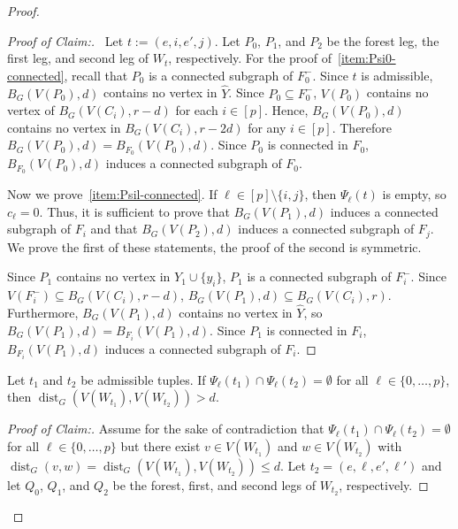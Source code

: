 \documentclass{patmorin}
\newcommand{\pat}[1]{\textcolor{Blue}{[Pat: #1]}}
\newenvironment{clmproof}{\begin{proof}[Proof of Claim:]\renewcommand{\qedsymbol}{\rule{1ex}{1ex}}}{\end{proof}}
\DeclareMathOperator{\dist}{dist}
\begin{document}
\begin{proof}
\begin{clmproof}\
    Let $t:=(e,i,e',j)$. 
    Let $P_0$, $P_1$, and $P_2$ be the forest leg, the first leg, and second leg of $W_t$, respectively.   For the proof of~\cref{item:Psi0-connected}, recall that $P_0$ is a connected subgraph of $F_0^-$. Since $t$ is admissible, $B_G(V(P_0),d)$ contains no vertex in $\widehat{Y}$. Since $P_0\subseteq F_0^-$, $V(P_0)$ contains no vertex of $B_G(V(C_i),r-d)$ for each $i\in[p]$. Hence, $B_G(V(P_0),d)$ contains no vertex in $B_G(V(C_i),r-2d)$ for any $i\in[p]$. Therefore $B_G(V(P_0),d)=B_{F_0}(V(P_0),d)$.
    Since $P_0$ is connected in $F_0$, 
    $B_{F_0}(V(P_0),d)$ induces a connected subgraph of $F_0$. 
    
    Now we prove~\cref{item:Psil-connected}. If $\ell\in [p]\setminus\{i,j\}$, then $\Psi_\ell(t)$ is empty, so $c_\ell=0$.
    Thus, it is sufficient to prove that $B_G(V(P_1), d)$ induces a connected subgraph of $F_i$ and that $B_G(V(P_2),d)$ induces a connected subgraph of $F_j$.  We prove the first of these statements, the proof of the second is symmetric.
    
    Since $P_1$ contains no vertex in $Y_1\cup\{y_i\}$, $P_1$ is a connected
    subgraph of $F_i^-$.  Since $V(F^-_i)\subseteq B_G(V(C_i),r-d)$, $B_G(V(P_1),d)\subseteq B_G(V(C_i),r)$.  Furthermore, $B_G(V(P_1),d)$ contains no vertex in $\widehat{Y}$, so $B_G(V(P_1),d)=B_{F_i}(V(P_1),d)$. 
    Since $P_1$ is connected in $F_i$, 
    $B_{F_i}(V(P_1),d)$ induces a connected subgraph of $F_i$. 
\end{clmproof}

\begin{clm}\label{w_distance}
  Let $t_1$ and $t_2$ be admissible tuples.
  If $\Psi_\ell(t_1)\cap \Psi_\ell(t_2)=\emptyset$ for all $\ell\in\{0,\ldots,p\}$, 
  then $\dist_G(V(W_{t_1}),V(W_{t_2}))> d$.  
\end{clm}



\begin{clmproof}
  Assume for the sake of contradiction that $\Psi_\ell(t_1)\cap\Psi_\ell(t_2)=\emptyset$ for all $\ell\in\{0,\ldots,p\}$ but there exist $v\in V(W_{t_1})$ and $w\in V(W_{t_2})$ with $\dist_G(v,w)=\dist_G(V(W_{t_1}),V(W_{t_2})) \le d$.  Let $t_2=(e,\ell,e',\ell')$ and let $Q_0$, $Q_1$, and $Q_2$ be the forest, first, and second legs of $W_{t_2}$, respectively.


\end{clmproof}
\end{proof}
\end{document}

